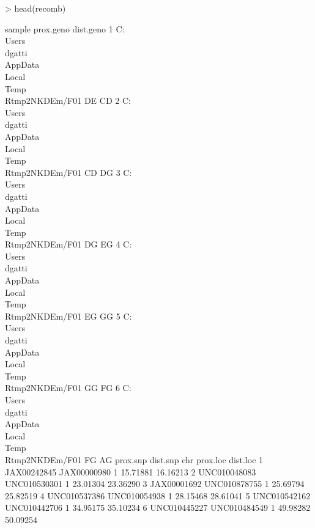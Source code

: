 \documentclass{article}
\begin{document}
\begin{Schunk}
\begin{Sinput}
> head(recomb)
\end{Sinput}
\begin{Soutput}
                                                   sample prox.geno dist.geno
1 C:\\Users\\dgatti\\AppData\\Local\\Temp\\Rtmp2NKDEm/F01        DE        CD
2 C:\\Users\\dgatti\\AppData\\Local\\Temp\\Rtmp2NKDEm/F01        CD        DG
3 C:\\Users\\dgatti\\AppData\\Local\\Temp\\Rtmp2NKDEm/F01        DG        EG
4 C:\\Users\\dgatti\\AppData\\Local\\Temp\\Rtmp2NKDEm/F01        EG        GG
5 C:\\Users\\dgatti\\AppData\\Local\\Temp\\Rtmp2NKDEm/F01        GG        FG
6 C:\\Users\\dgatti\\AppData\\Local\\Temp\\Rtmp2NKDEm/F01        FG        AG
      prox.snp     dist.snp chr prox.loc dist.loc
1  JAX00242845  JAX00000980   1 15.71881 16.16213
2 UNC010048083 UNC010530301   1 23.01304 23.36290
3  JAX00001692 UNC010878755   1 25.69794 25.82519
4 UNC010537386 UNC010054938   1 28.15468 28.61041
5 UNC010542162 UNC010442706   1 34.95175 35.10234
6 UNC010445227 UNC010484549   1 49.98282 50.09254
\end{Soutput}
\end{Schunk}
\end{document}
